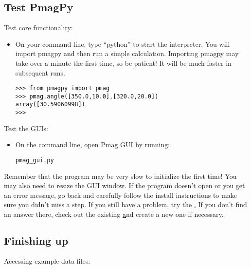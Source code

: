 \documentclass[11pt]{article}
\begin{document}
\subsection{Test PmagPy}

Test core functionality:

\begin{itemize}
  \item On your command line, type ``python'' to start the interpreter.  You will import pmagpy and then run a simple calculation.  Importing pmagpy may take over a minute the first time, so be patient!  It will be much faster in subsequent runs.

\begin{verbatim}
>>> from pmagpy import pmag
>>> pmag.angle([350.0,10.0],[320.0,20.0])
array([30.59060998])
>>>
\end{verbatim}

\end{itemize}

Test the GUIs:

\begin{itemize}
\item  On the command line, open Pmag GUI by running:

\begin{verbatim}
pmag_gui.py
\end{verbatim}

\end{itemize}

Remember that the program may be very slow to initialize the first time!  You may also need to resize the GUI window.  If the program doesn't open or you get an error message, go back and carefully follow the install instructions to make sure you didn't miss a step.  If you still have a problem, try the \href{https://earthref.org/PmagPy/cookbook/#trouble%7D%7BTroubleshooting section}.  If you don't find an answer there, check out the existing \href{https://urldefense.proofpoint.com/v2/url?u=https-3A__github.com_PmagPy_PmagPy_issues-257D-257BGithub&d=DwIGAg&c=-35OiAkTchMrZOngvJPOeA&r=HLmFoB00cDyPMQ7s6Fl35Q&m=9TB00hCAaShZt5cteDvwqhnCi3nTUrwrqW7n_PywH0XvmSc18bYYYeEFO5tqVczP&s=lC18TbUvH50cdj2c4_qWjsRCFVTSBW16Ts8BZwG-Wrw&e=  issues} and create a new one if necessary.

\subsection{Finishing up}

Accessing example data files:
\end{document}
